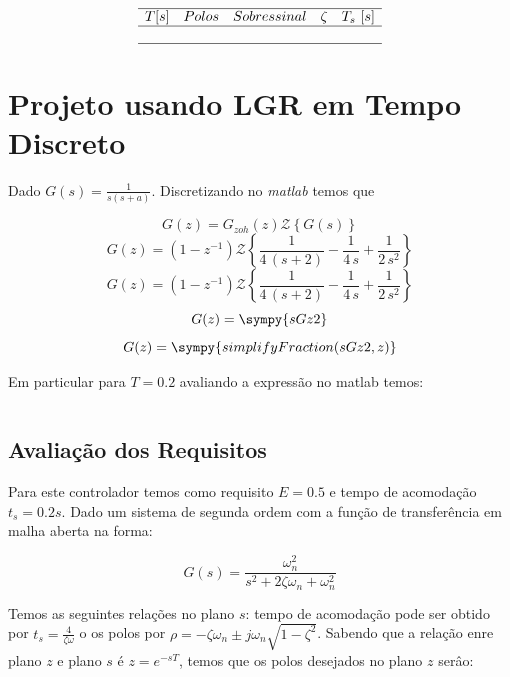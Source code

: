 \documentclass[a4paper,11pt]{article}
\begin{document}
\begin{table}[H]
    $$
    \begin{array}{ccccc}
        \hline
        T [s] & Polos & Sobressinal & \zeta & T_s\ [s] \\
        \hline
        
        \\\hline
    \end{array}
    $$
\end{table}

\subsection{}

\section{Projeto usando LGR em Tempo Discreto}

Dado $G(s) = \frac{1}{s(s+a)}$. Discretizando no \textit{matlab} temos que


$$G(z) = G_{zoh}(z)\mathcal{Z}\left\{G(s)\right\}$$
$$G(z) = (1-z^{-1})\mathcal{Z}\left\{\frac{1}{4\,\left(s+2\right)}-\frac{1}{4\,s}+\frac{1}{2\,s^2}\right\} $$
$$G(z) = (1-z^{-1})\mathcal{Z}\left\{\frac{1}{4\,\left(s+2\right)}-\frac{1}{4\,s}+\frac{1}{2\,s^2}\right\} $$
$$G(z) = \sympy{sGz2}$$
$$G(z) = \sympy{simplifyFraction(sGz2,z)}$$

Em particular para $T=0.2$ avaliando a expressão no matlab temos:

$$$$

\subsection{Avaliação dos Requisitos}

Para este controlador temos como requisito $E=0.5$ e tempo de acomodação $t_s = 0.2s$. Dado um sistema de segunda ordem com a função de transferência em malha aberta na forma:

\begin{equation}
    G(s) = \frac{\omega_n^2}{s^2 + 2\zeta\omega_n + \omega_n^2}
\end{equation}

Temos as seguintes relações no plano $s$: tempo de acomodação pode ser obtido por $t_s = \frac{4}{\zeta\omega}$
o os polos por $ \rho = -\zeta\omega_n \pm j\omega_n\sqrt{1-\zeta^2}$. Sabendo que a relação enre plano $z$ e plano $s$ é $z=e^{-sT}$, temos que os polos desejados no plano $z$ serâo:
\end{document}

